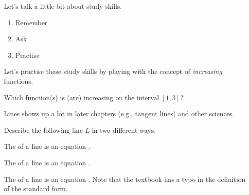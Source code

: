 \documentclass[../main.tex]{subfiles}
\begin{document}
\clearpage
Let's talk a little bit about study skills. 

\begin{mdframed}[style=simple]
  \begin{enumerate}
    \item Remember \underline{\hspace{4in}}
    \item Ask \underline{\hspace{4.5in}}
    \item Practise \underline{\hspace{4.2in}} 
  \end{enumerate}
\end{mdframed}


\begin{example}
  Let's practise these study skills by playing with the concept of \emph{increasing} functions.

  \faComments{} Which function(s) is (are) increasing on the interval \([1,3]\)?

  \begin{center}
    
    \quad
    
    \quad
    
  \end{center}
\end{example}
\clearpage

Lines shows up a lot in later chapters (e.g., tangent lines) and other sciences.

\begin{example}
  Describe the following line \(L\)  in two different ways.

  
\end{example}

The  of a line is an equation \underline{\hspace{2in}}.


The  of a line is an equation \underline{\hspace{2in}}.


The  of a line is an equation \underline{\hspace{2in}}. \newline
{\scriptsize \faExclamationTriangle{} Note that the textbook has a typo in the definition of the standard form.}
\end{document}
